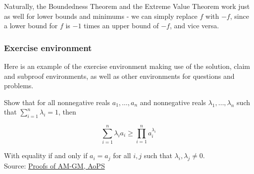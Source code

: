 \begin{remark}
	Naturally, the Boundedness Theorem and the Extreme Value Theorem work just as well for lower bounds and minimums - we can simply replace \(f\) with \(-f\), since a lower bound for \(f\) is \(-1\) times an upper bound of \(-f\), and vice versa. 
\end{remark}

\subsubsection{Exercise environment}

Here is an example of the exercise environment making use of the solution, claim and subproof environments, as well as other environments for questions and problems.  

\begin{exercise}[Weighted AM-GM]\label{AM-GM}
	
\end{exercise}
Show that for all nonnegative reals \(a_1,\ldots,a_n\) and nonnegative reals \(\lambda_1,\ldots,\lambda_n\) such that \(\displaystyle\sum_{i=1}^{n}\lambda_i=1\), then

\[\sum_{i=1}^n\lambda_ia_i\geq\prod_{i=1}^na_i^{\lambda_i}\]

With equality if and only if \(a_i=a_j\) for all \(i,j\) such that \(\lambda_i,\lambda_j\ne 0\).\\

\noindent\small{Source: \href{https://artofproblemsolving.com/wiki/index.php/Proofs_of_AM-GM#Proofs_of_Unweighted_AM-GM}{Proofs of AM-GM, AoPS}}

